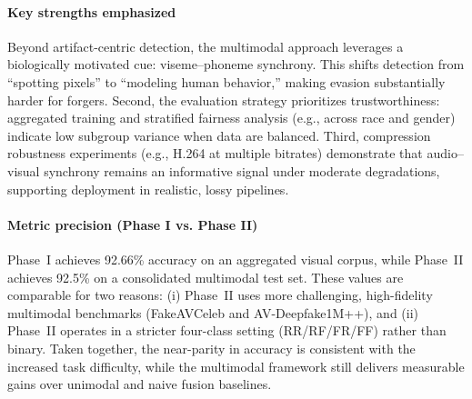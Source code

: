 \paragraph{Key strengths emphasized}
Beyond artifact-centric detection, the multimodal approach leverages a biologically motivated cue: viseme--phoneme synchrony. This shifts detection from “spotting pixels” to “modeling human behavior,” making evasion substantially harder for forgers. Second, the evaluation strategy prioritizes trustworthiness: aggregated training and stratified fairness analysis (e.g., across race and gender) indicate low subgroup variance when data are balanced. Third, compression robustness experiments (e.g., H.264 at multiple bitrates) demonstrate that audio--visual synchrony remains an informative signal under moderate degradations, supporting deployment in realistic, lossy pipelines.

\paragraph{Metric precision (Phase I vs. Phase II)}
Phase~I achieves 92.66\% accuracy on an aggregated visual corpus, while Phase~II achieves 92.5\% on a consolidated multimodal test set. These values are comparable for two reasons: (i) Phase~II uses more challenging, high-fidelity multimodal benchmarks (FakeAVCeleb and AV-Deepfake1M++), and (ii) Phase~II operates in a stricter four-class setting (RR/RF/FR/FF) rather than binary. Taken together, the near-parity in accuracy is consistent with the increased task difficulty, while the multimodal framework still delivers measurable gains over unimodal and naive fusion baselines.

